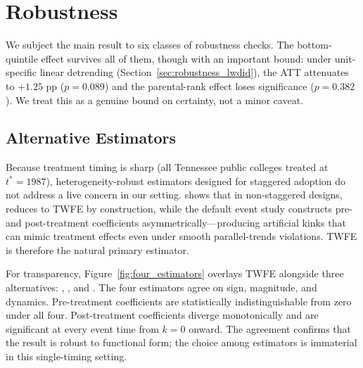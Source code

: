 
\section{Robustness}
\label{sec:robustness}

We subject the main result to six classes of robustness checks. The
bottom-quintile effect survives all of them, though with an important
bound: under unit-specific linear detrending
(Section~\ref{sec:robustness_lwdid}), the ATT attenuates to $+1.25$
pp ($p = 0.089$) and the parental-rank effect loses significance
($p = 0.382$). We treat this as a genuine bound on certainty, not a
minor caveat.

\subsection{Alternative Estimators}
\label{sec:robustness_estimators}

Because treatment timing is sharp (all Tennessee public colleges treated
at $t^* = 1987$), heterogeneity-robust estimators designed for staggered
adoption do not address a live concern in our setting.
\textcite{roth2026interpreting} shows that in non-staggered designs,
\textcite{sun2021estimating} reduces to TWFE by construction, while
the default \textcite{callaway2021difference} event study constructs
pre- and post-treatment coefficients asymmetrically---producing
artificial kinks that can mimic treatment effects even under smooth
parallel-trends violations. TWFE is therefore the natural primary
estimator.

For transparency, Figure~\ref{fig:four_estimators} overlays TWFE
alongside three alternatives:
\textcite{callaway2021difference}, \textcite{sun2021estimating}, and
\textcite{dechaisemartin2020two}. The four estimators agree on sign,
magnitude, and dynamics. Pre-treatment coefficients are statistically
indistinguishable from zero under all four. Post-treatment coefficients
diverge monotonically and are significant at every event time from
$k = 0$ onward. The agreement confirms that the result is robust to
functional form; the choice among estimators is immaterial in this
single-timing setting.

